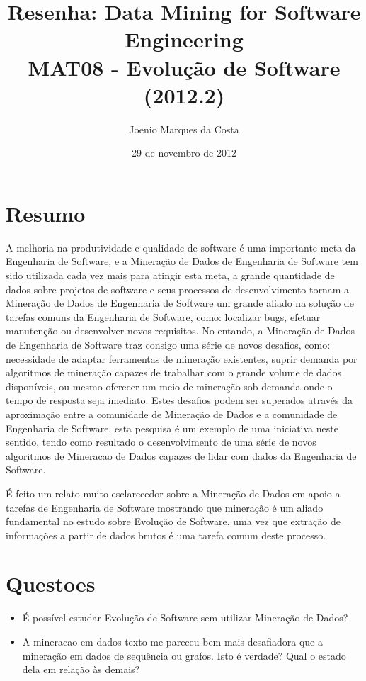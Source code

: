 \documentclass[12pt]{article}
\title{Resenha: Data Mining for Software Engineering \cite{DataMiningfo} \\
 \large MAT08 - Evolução de Software (2012.2)}
\author{Joenio Marques da Costa}
\date{29 de novembro de 2012}
\begin{document}
\maketitle

\section{Resumo}


A melhoria na produtividade e qualidade de software é uma importante meta da
Engenharia de Software, e a Mineração de Dados de Engenharia de Software tem
sido utilizada cada vez mais para atingir esta meta, a grande quantidade de
dados sobre projetos de software e seus processos de desenvolvimento tornam a
Mineração de Dados de Engenharia de Software um grande aliado na solução de
tarefas comuns da Engenharia de Software, como: localizar bugs, efetuar
manutenção ou desenvolver novos requisitos. No entando, a Mineração de Dados de
Engenharia de Software traz consigo uma série de novos desafios, como:
necessidade de adaptar ferramentas de mineração existentes, suprir demanda por
algoritmos de mineração capazes de trabalhar com o grande volume de dados
disponíveis, ou mesmo oferecer um meio de mineração sob demanda onde o tempo de
resposta seja imediato. Estes desafios podem ser superados através da
aproximação entre a comunidade de Mineração de Dados e a comunidade de
Engenharia de Software, esta pesquisa é um exemplo de uma iniciativa neste
sentido, tendo como resultado o desenvolvimento de uma série de novos
algoritmos de Mineracao de Dados capazes de lidar com dados da Engenharia de
Software.

É feito um relato muito esclarecedor sobre a Mineração de Dados em apoio a
tarefas de Engenharia de Software mostrando que mineração é um aliado
fundamental no estudo sobre Evolução de Software, uma vez que extração de
informações a partir de dados brutos é uma tarefa comum deste processo.

\section{Questoes}

\begin{itemize}
  \item É possível estudar Evolução de Software sem utilizar Mineração de
     Dados?
  \item A mineracao em dados texto me pareceu bem mais desafiadora que a
     mineração em dados de sequência ou grafos. Isto é verdade? Qual o estado
     dela em relação às demais?
\end{itemize}


\end{document}
